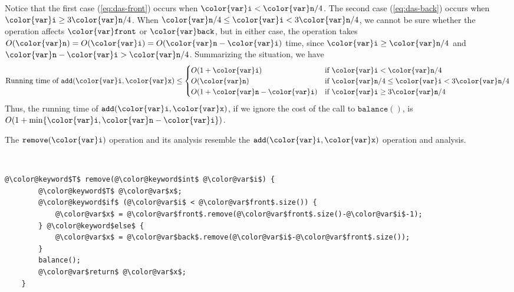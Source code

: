 \documentclass[10pt]{book}
\newcommand{\myeqref}[1]{(\ref{eq:#1})}
\theoremstyle{plain}
\theoremstyle{definition}
\begin{document}
Notice that the first case \myeqref{das-front} occurs when $\ensuremath{\mathtt{{\color{var}i}}}<\ensuremath{\mathtt{{\color{var}n}}}/4$.
The second case \myeqref{das-back} occurs when $\ensuremath{\mathtt{{\color{var}i}}}\ge 3\ensuremath{\mathtt{{\color{var}n}}}/4$.  When
$\ensuremath{\mathtt{{\color{var}n}}}/4\le\ensuremath{\mathtt{{\color{var}i}}}<3\ensuremath{\mathtt{{\color{var}n}}}/4$, we cannot be sure whether the operation affects
\ensuremath{\mathtt{{\color{var}front}}} or \ensuremath{\mathtt{{\color{var}back}}}, but in either case, the operation takes
$O(\ensuremath{\mathtt{{\color{var}n}}})=O(\ensuremath{\mathtt{{\color{var}i}}})=O(\ensuremath{\mathtt{{\color{var}n}}}-\ensuremath{\mathtt{{\color{var}i}}})$ time, since $\ensuremath{\mathtt{{\color{var}i}}}\ge \ensuremath{\mathtt{{\color{var}n}}}/4$ and $\ensuremath{\mathtt{{\color{var}n}}}-\ensuremath{\mathtt{{\color{var}i}}}>
\ensuremath{\mathtt{{\color{var}n}}}/4$.  Summarizing the situation, we have
\[
     \mbox{Running time of } \ensuremath{\mathtt{add({\color{var}i},{\color{var}x})}} \le 
          \begin{cases}
            O(1+ \ensuremath{\mathtt{{\color{var}i}}}) & \mbox{if $\ensuremath{\mathtt{{\color{var}i}}}< \ensuremath{\mathtt{{\color{var}n}}}/4$} \\
            O(\ensuremath{\mathtt{{\color{var}n}}}) & \mbox{if $\ensuremath{\mathtt{{\color{var}n}}}/4 \le \ensuremath{\mathtt{{\color{var}i}}} < 3\ensuremath{\mathtt{{\color{var}n}}}/4$} \\
            O(1+\ensuremath{\mathtt{{\color{var}n}}}-\ensuremath{\mathtt{{\color{var}i}}}) & \mbox{if $\ensuremath{\mathtt{{\color{var}i}}} \ge 3\ensuremath{\mathtt{{\color{var}n}}}/4$}
          \end{cases}
\]
Thus, the running time of \ensuremath{\mathtt{add({\color{var}i},{\color{var}x})}}, if we ignore the cost of the call
to \ensuremath{\mathtt{balance()}}, is $O(1+\min\{\ensuremath{\mathtt{{\color{var}i}}}, \ensuremath{\mathtt{{\color{var}n}}}-\ensuremath{\mathtt{{\color{var}i}}}\})$.

The \ensuremath{\mathtt{remove({\color{var}i})}} operation and its analysis resemble the \ensuremath{\mathtt{add({\color{var}i},{\color{var}x})}}
operation and analysis.



 \ \vspace{.5ex}\begin{Verbatim}[gobble=1,tabsize=2,frame=single,framerule=1.2pt,commandchars=\\@\$,label=\texttt{DualArrayDeque},labelposition=topline]
	@\color@keyword$T$ remove(@\color@keyword$int$ @\color@var$i$) {
		@\color@keyword$T$ @\color@var$x$;
		@\color@keyword$if$ (@\color@var$i$ < @\color@var$front$.size()) {
			@\color@var$x$ = @\color@var$front$.remove(@\color@var$front$.size()-@\color@var$i$-1);
		} @\color@keyword$else$ {
			@\color@var$x$ = @\color@var$back$.remove(@\color@var$i$-@\color@var$front$.size());
		}
		balance();
		@\color@var$return$ @\color@var$x$;
	}
\end{Verbatim}
\end{document}
